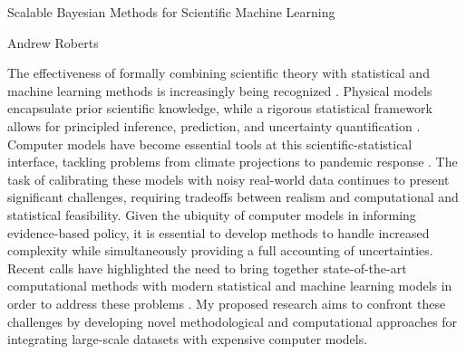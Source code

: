 \documentclass[12pt]{article}
\begin{document}
\begin{center}
Scalable Bayesian Methods for Scientific Machine Learning
\end{center}

\begin{flushright}
Andrew Roberts
\end{flushright} 

The effectiveness of formally combining scientific theory with statistical and machine learning methods is increasingly being recognized \cite{Willcox, Laubmeier, Wikle}. 
Physical models encapsulate prior scientific knowledge, while a rigorous statistical framework allows for principled inference, prediction, and uncertainty quantification \cite{Clark}. Computer models have become essential tools at this scientific-statistical interface, tackling problems from 
climate projections \cite{Canadell} to pandemic response \cite{Swallow}. The task of calibrating these models with noisy real-world data continues to present
significant challenges, requiring tradeoffs between realism and computational and statistical feasibility. Given the ubiquity of computer models in informing
 evidence-based policy, it is essential to develop methods to handle increased complexity while simultaneously providing a full accounting of uncertainties.
Recent calls have highlighted the need to bring together state-of-the-art computational methods with modern statistical 
and machine learning models in order to address these problems \cite{Wikle, Baker}. My proposed research aims to confront these challenges by developing novel methodological and computational approaches for integrating large-scale datasets with expensive computer models. 
\end{document}
